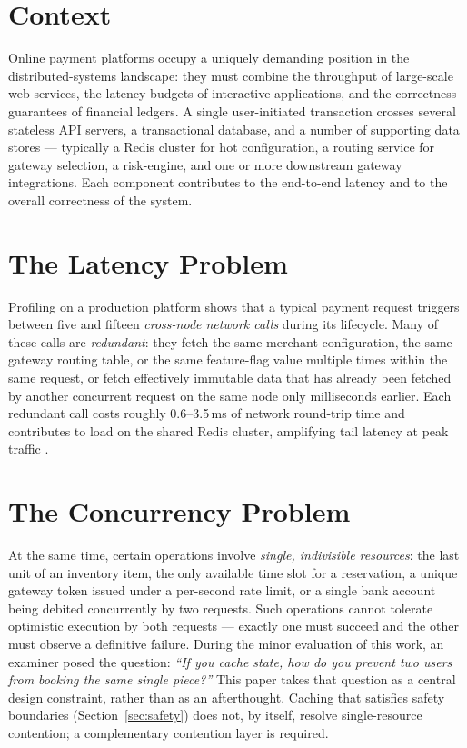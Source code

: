 \section{Context}
Online payment platforms occupy a uniquely demanding position in the distributed-systems landscape: they must combine the throughput of large-scale web services, the latency budgets of interactive applications, and the correctness guarantees of financial ledgers. A single user-initiated transaction crosses several stateless API servers, a transactional database, and a number of supporting data stores --- typically a Redis cluster for hot configuration, a routing service for gateway selection, a risk-engine, and one or more downstream gateway integrations. Each component contributes to the end-to-end latency and to the overall correctness of the system.

\section{The Latency Problem}
Profiling on a production platform shows that a typical payment request triggers between five and fifteen \emph{cross-node network calls} during its lifecycle. Many of these calls are \emph{redundant}: they fetch the same merchant configuration, the same gateway routing table, or the same feature-flag value multiple times within the same request, or fetch effectively immutable data that has already been fetched by another concurrent request on the same node only milliseconds earlier. Each redundant call costs roughly 0.6--3.5\,ms of network round-trip time and contributes to load on the shared Redis cluster, amplifying tail latency at peak traffic \cite{kumar2024caching, qin2024tailcache}.

\section{The Concurrency Problem}
At the same time, certain operations involve \emph{single, indivisible resources}: the last unit of an inventory item, the only available time slot for a reservation, a unique gateway token issued under a per-second rate limit, or a single bank account being debited concurrently by two requests. Such operations cannot tolerate optimistic execution by both requests --- exactly one must succeed and the other must observe a definitive failure. During the minor evaluation of this work, an examiner posed the question: \emph{``If you cache state, how do you prevent two users from booking the same single piece?''} This paper takes that question as a central design constraint, rather than as an afterthought. Caching that satisfies safety boundaries (Section~\ref{sec:safety}) does not, by itself, resolve single-resource contention; a complementary contention layer is required.

